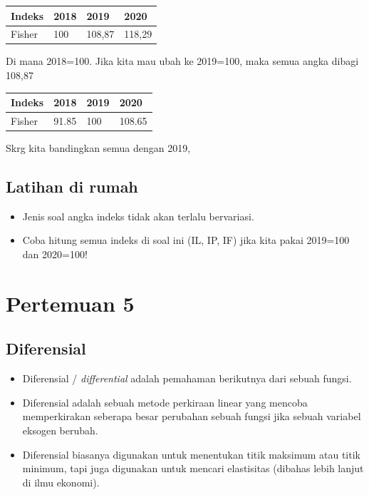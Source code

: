 \documentclass[
  letterpaper,
  DIV=11,
  numbers=noendperiod]{scrartcl}
\begin{document}
\begin{longtable}[]{@{}llll@{}}
\toprule\noalign{}
Indeks & 2018 & 2019 & 2020 \\
\midrule\noalign{}
\endhead
\bottomrule\noalign{}
\endlastfoot
Fisher & 100 & 108,87 & 118,29 \\
\end{longtable}

Di mana 2018=100. Jika kita mau ubah ke 2019=100, maka semua angka
dibagi 108,87

\begin{longtable}[]{@{}llll@{}}
\toprule\noalign{}
Indeks & 2018 & 2019 & 2020 \\
\midrule\noalign{}
\endhead
\bottomrule\noalign{}
\endlastfoot
Fisher & 91.85 & 100 & 108.65 \\
\end{longtable}

Skrg kita bandingkan semua dengan 2019,

\hypertarget{latihan-di-rumah}{%
\subsection{Latihan di rumah}\label{latihan-di-rumah}}

\begin{itemize}
\item
  Jenis soal angka indeks tidak akan terlalu bervariasi.
\item
  Coba hitung semua indeks di soal ini (IL, IP, IF) jika kita pakai
  2019=100 dan 2020=100!
\end{itemize}

\hypertarget{pertemuan-5}{%
\section{Pertemuan 5}\label{pertemuan-5}}

\hypertarget{diferensial}{%
\subsection{Diferensial}\label{diferensial}}

\begin{itemize}
\item
  Diferensial / \emph{differential} adalah pemahaman berikutnya dari
  sebuah fungsi.
\item
  Diferensial adalah sebuah metode perkiraan linear yang mencoba
  memperkirakan seberapa besar perubahan sebuah fungsi jika sebuah
  variabel eksogen berubah.
\item
  Diferensial biasanya digunakan untuk menentukan titik maksimum atau
  titik minimum, tapi juga digunakan untuk mencari elastisitas (dibahas
  lebih lanjut di ilmu ekonomi).
\end{itemize}
\end{document}

